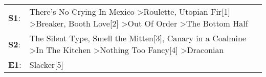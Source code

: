 \begin{supertabular}{p{0.03\textwidth}p{0.92\textwidth}}
 \textbf{S1}:  &  There's No Crying In Mexico\textsuperscript{} \textgreater \enspace Roulette\textsuperscript{}, \enspace Utopian Fir[1]\textsuperscript{} \textgreater \enspace Breaker\textsuperscript{}, \enspace Booth Love[2]\textsuperscript{} \textgreater \enspace Out Of Order\textsuperscript{} \textgreater \enspace The Bottom Half\textsuperscript{}  \enspace  \\
 \textbf{S2}:  &                                          The Silent Type\textsuperscript{}, \enspace Smell the Mitten[3]\textsuperscript{}, \enspace Canary in a Coalmine\textsuperscript{} \textgreater \enspace In The Kitchen\textsuperscript{} \textgreater \enspace Nothing Too Fancy[4]\textsuperscript{} \textgreater \enspace Draconian\textsuperscript{}  \enspace  \\
 \textbf{E1}:  &                                                                                                                                                                                                                                                                                                                      Slacker[5]\textsuperscript{}  \enspace  \\
\end{supertabular}
